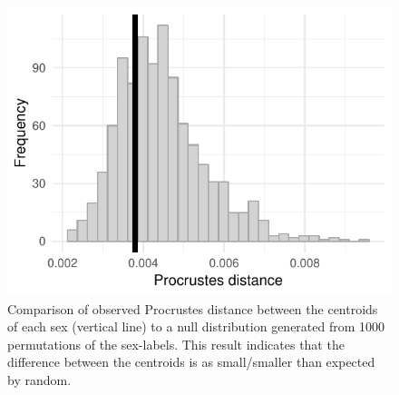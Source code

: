 \documentclass[10pt,letterpaper]{article}
\begin{document}
\begin{figure}[h]
  \centering
  \includegraphics[height = 0.3\textheight, width = \textwidth, keepaspectratio = true]{figure/sex_test_hist}
  \caption{Comparison of observed Procrustes distance between the centroids of each sex (vertical line) to a null distribution generated from 1000 permutations of the sex-labels. This result indicates that the difference between the centroids is as small/smaller than expected by random.}
  \label{fig:sex_test}
\end{figure}
\end{document}
